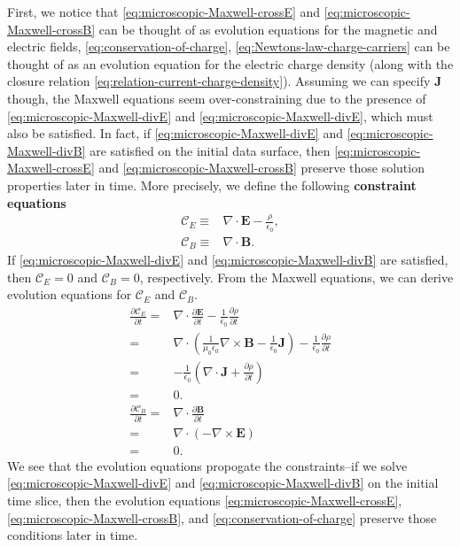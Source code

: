 \documentclass[12pt]{report}
\newcommand{\bB}{{\bm B}}
\newcommand{\bE}{{\bm E}}
\newcommand{\bJ}{{\bm J}}
\begin{document}
First, we notice that \eqref{eq:microscopic-Maxwell-crossE} and \eqref{eq:microscopic-Maxwell-crossB} can be thought of as evolution equations for the magnetic and electric fields, \eqref{eq:conservation-of-charge}, \eqref{eq:Newtons-law-charge-carriers} can be thought of as an evolution equation for the electric charge density (along with the closure relation \eqref{eq:relation-current-charge-density}).
Assuming we can specify $\bJ$ though, the Maxwell equations seem over-constraining due to the presence of \eqref{eq:microscopic-Maxwell-divE} and \eqref{eq:microscopic-Maxwell-divE}, which must also be satisfied.
In fact, if \eqref{eq:microscopic-Maxwell-divE} and \eqref{eq:microscopic-Maxwell-divB} are satisfied on the initial data surface, then \eqref{eq:microscopic-Maxwell-crossE} and \eqref{eq:microscopic-Maxwell-crossB} preserve those solution properties later in time. 
More precisely, we define the following \textbf{constraint equations}
\begin{subequations}
\label{eq:constraint-equations}
\begin{align}
    \mathcal{C}_E
    \equiv&
    \nabla\cdot \bE - \frac{\rho}{\epsilon_0}
    ,\\
    \mathcal{C}_B
    \equiv&
    \nabla\cdot\bB
    .
\end{align}
\end{subequations}
If \eqref{eq:microscopic-Maxwell-divE} and \eqref{eq:microscopic-Maxwell-divB} are satisfied, then $\mathcal{C}_E=0$ and $\mathcal{C}_B=0$, respectively.
From the Maxwell equations, we can derive evolution equations for $\mathcal{C}_E$ and $\mathcal{C}_B$. 
\begin{align}
    \frac{\partial\mathcal{C}_E}{\partial t}
    =&
    \nabla\cdot\frac{\partial\bE}{\partial t}
    -
    \frac{1}{\epsilon_0}\frac{\partial \rho}{\partial t}
    \nonumber\\
    =&
    \nabla\cdot\left(\frac{1}{\mu_0\epsilon_0}\nabla\times\bB - \frac{1}{\epsilon_0}\bJ\right)  
    -
    \frac{1}{\epsilon_0}\frac{\partial \rho}{\partial t}
    \nonumber\\
    =&
    -
    \frac{1}{\epsilon_0}\left(
        \nabla\cdot\bJ
        +
        \frac{\partial \rho}{\partial t}
    \right)
    \nonumber\\
    =&
    0
    .\\
    \frac{\partial\mathcal{C}_B}{\partial t}
    =&
    \nabla\cdot\frac{\partial\bB}{\partial t}
    \nonumber\\
    =&
    \nabla\cdot\left(-\nabla\times\bE\right)
    \nonumber\\
    =&
    0
    .
\end{align}
We see that the evolution equations propogate the constraints--if we solve \eqref{eq:microscopic-Maxwell-divE} and \eqref{eq:microscopic-Maxwell-divB} on the initial time slice, then the evolution equations \eqref{eq:microscopic-Maxwell-crossE}, \eqref{eq:microscopic-Maxwell-crossB}, and \eqref{eq:conservation-of-charge} preserve those conditions later in time.
\end{document}
